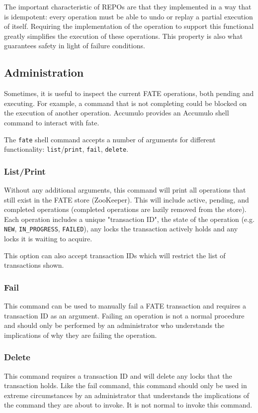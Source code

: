 The important characteristic of REPOs are that they implemented in a way that is idempotent:
every operation must be able to undo or replay a partial execution of itself. Requiring the 
implementation of the operation to support this functional greatly simplifies the execution
of these operations. This property is also what guarantees safety in light of failure conditions.

\subsection{Administration}

Sometimes, it is useful to inspect the current FATE operations, both pending and executing.
For example, a command that is not completing could be blocked on the execution of another
operation. Accumulo provides an Accumulo shell command to interact with fate.

The \texttt{fate} shell command accepts a number of arguments for different functionality:
\texttt{list}/\texttt{print}, \texttt{fail}, \texttt{delete}.

\subsubsection{List/Print}

Without any additional arguments, this command will print all operations that still exist in
the FATE store (ZooKeeper). This will include active, pending, and completed operations (completed
operations are lazily removed from the store). Each operation includes a unique "transaction ID", the
state of the operation (e.g. \texttt{NEW}, \texttt{IN\_PROGRESS}, \texttt{FAILED}), any locks the
transaction actively holds and any locks it is waiting to acquire.

This option can also accept transaction IDs which will restrict the list of transactions shown.

\subsubsection{Fail}

This command can be used to manually fail a FATE transaction and requires a transaction ID
as an argument. Failing an operation is not a normal procedure and should only be performed
by an administrator who understands the implications of why they are failing the operation.

\subsubsection{Delete}

This command requires a transaction ID and will delete any locks that the transaction
holds. Like the fail command, this command should only be used in extreme circumstances
by an administrator that understands the implications of the command they are about to 
invoke. It is not normal to invoke this command.
